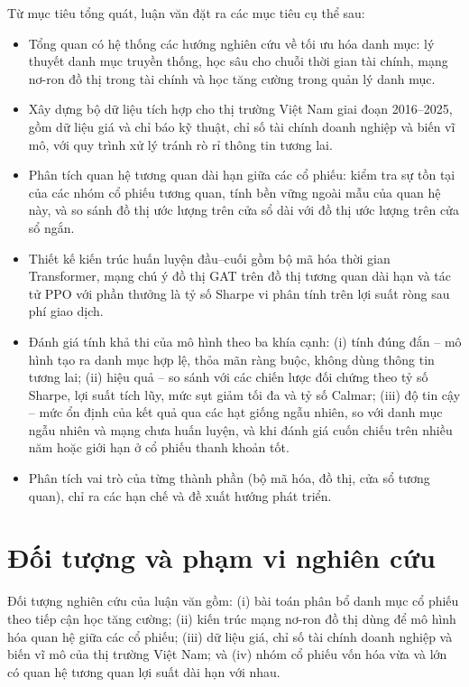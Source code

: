 Từ mục tiêu tổng quát, luận văn đặt ra các mục tiêu cụ thể sau:
\begin{itemize}
  \item Tổng quan có hệ thống các hướng nghiên cứu về tối ưu hóa danh mục: lý thuyết danh mục truyền thống, học sâu cho chuỗi thời gian tài chính, mạng nơ-ron đồ thị trong tài chính và học tăng cường trong quản lý danh mục.
  \item Xây dựng bộ dữ liệu tích hợp cho thị trường Việt Nam giai đoạn 2016--2025, gồm dữ liệu giá và chỉ báo kỹ thuật, chỉ số tài chính doanh nghiệp và biến vĩ mô, với quy trình xử lý tránh rò rỉ thông tin tương lai.
  \item Phân tích quan hệ tương quan dài hạn giữa các cổ phiếu: kiểm tra sự tồn tại của các nhóm cổ phiếu tương quan, tính bền vững ngoài mẫu của quan hệ này, và so sánh đồ thị ước lượng trên cửa sổ dài với đồ thị ước lượng trên cửa sổ ngắn.
  \item Thiết kế kiến trúc huấn luyện đầu--cuối gồm bộ mã hóa thời gian Transformer, mạng chú ý đồ thị GAT trên đồ thị tương quan dài hạn và tác tử PPO với phần thưởng là tỷ số Sharpe vi phân tính trên lợi suất ròng sau phí giao dịch.
  \item Đánh giá tính khả thi của mô hình theo ba khía cạnh: (i) tính đúng đắn -- mô hình tạo ra danh mục hợp lệ, thỏa mãn ràng buộc, không dùng thông tin tương lai; (ii) hiệu quả -- so sánh với các chiến lược đối chứng theo tỷ số Sharpe, lợi suất tích lũy, mức sụt giảm tối đa và tỷ số Calmar; (iii) độ tin cậy -- mức ổn định của kết quả qua các hạt giống ngẫu nhiên, so với danh mục ngẫu nhiên và mạng chưa huấn luyện, và khi đánh giá cuốn chiếu trên nhiều năm hoặc giới hạn ở cổ phiếu thanh khoản tốt.
  \item Phân tích vai trò của từng thành phần (bộ mã hóa, đồ thị, cửa sổ tương quan), chỉ ra các hạn chế và đề xuất hướng phát triển.
\end{itemize}

\section*{Đối tượng và phạm vi nghiên cứu}

Đối tượng nghiên cứu của luận văn gồm: (i) bài toán phân bổ danh mục cổ phiếu theo tiếp cận học tăng cường; (ii) kiến trúc mạng nơ-ron đồ thị dùng để mô hình hóa quan hệ giữa các cổ phiếu; (iii) dữ liệu giá, chỉ số tài chính doanh nghiệp và biến vĩ mô của thị trường Việt Nam; và (iv) nhóm cổ phiếu vốn hóa vừa và lớn có quan hệ tương quan lợi suất dài hạn với nhau.

